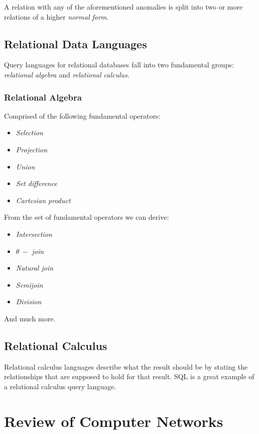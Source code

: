 \documentclass[12pt]{article}
\begin{document}
A relation with any of the aforementioned anomalies is split into two or more relations of a higher \textit{normal form}.

\subsection{Relational Data Languages}

Query languages for relational databases fall into two fundamental groups: \textit{relational algebra} and \textit{relational calculus}.

\subsubsection{Relational Algebra}

Comprised of the following fundamental operators:
\begin{itemize}
	\item \textit{Selection}
	\item \textit{Projection}
	\item \textit{Union}
	\item \textit{Set difference}
	\item \textit{Cartesian product}
\end{itemize}

From the set of fundamental operators we can derive:
\begin{itemize}
	\item \textit{Intersection}
	\item \textit{$\theta \ -$ join}
	\item \textit{Natural join}
	\item \textit{Semijoin}
	\item \textit{Division}
\end{itemize}

And much more.

\subsection{Relational Calculus}

Relational calculus languages describe what the result should be by stating the relationships that are supposed to hold for that result. SQL is a great example of a relational calculus query language. 

\section{Review of Computer Networks}
\end{document}
